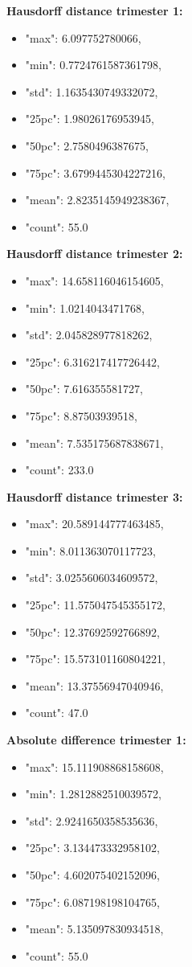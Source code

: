 	\textbf{Hausdorff distance trimester 1:}
	\begin{itemize}
		\item "max": 6.097752780066,
		\item "min": 0.7724761587361798,
		\item "std": 1.1635430749332072,
		\item "25pc": 1.98026176953945,
		\item "50pc": 2.7580496387675,
		\item "75pc": 3.6799445304227216,
		\item "mean": 2.8235145949238367,
		\item "count": 55.0
	\end{itemize}

	\textbf{Hausdorff distance trimester 2:}
	\begin{itemize}
		\item "max": 14.658116046154605,
		\item "min": 1.0214043471768,
		\item "std": 2.045828977818262,
		\item "25pc": 6.316217417726442,
		\item "50pc": 7.616355581727,
		\item "75pc": 8.87503939518,
		\item "mean": 7.535175687838671,
		\item "count": 233.0
	\end{itemize}

	\textbf{Hausdorff distance trimester 3:}
	\begin{itemize}
		\item "max": 20.589144777463485,
		\item "min": 8.011363070117723,
		\item "std": 3.0255606034609572,
		\item "25pc": 11.575047545355172,
		\item "50pc": 12.37692592766892,
		\item "75pc": 15.573101160804221,
		\item "mean": 13.37556947040946,
		\item "count": 47.0
	\end{itemize}

	\textbf{Absolute difference trimester 1:}
	\begin{itemize}
		\item "max": 15.111908868158608,
		\item "min": 1.2812882510039572,
		\item "std": 2.9241650358535636,
		\item "25pc": 3.134473332958102,
		\item "50pc": 4.602075402152096,
		\item "75pc": 6.087198198104765,
		\item "mean": 5.135097830934518,
		\item "count": 55.0
	\end{itemize}


